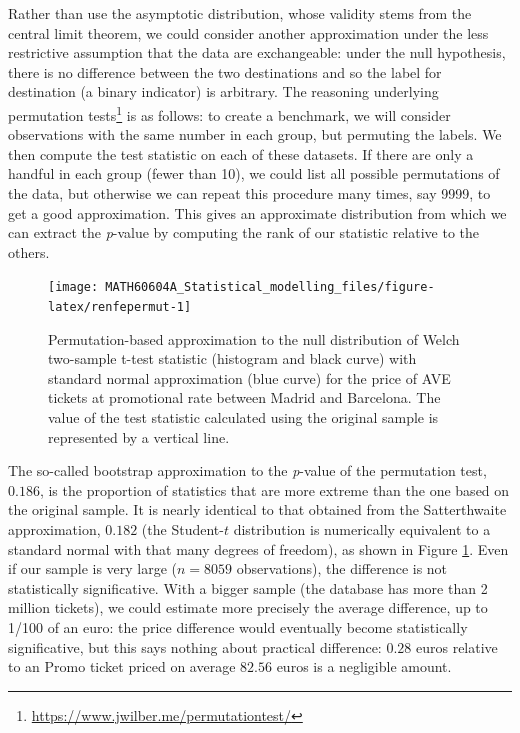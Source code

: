 \documentclass[
  11pt,
  letterpaper,
]{book}
\renewcommand{\href}[2]{#2\footnote{\url{#1}}}
\theoremstyle{definition}
\theoremstyle{definition}
\theoremstyle{definition}
\theoremstyle{definition}
\theoremstyle{remark}
\begin{document}
Rather than use the asymptotic distribution, whose validity stems from the central limit theorem, we could consider another approximation under the less restrictive assumption that the data are exchangeable: under the null hypothesis, there is no difference between the two destinations and so the label for destination (a binary indicator) is arbitrary. The reasoning underlying \href{https://www.jwilber.me/permutationtest/}{permutation tests} is as follows: to create a benchmark, we will consider observations with the same number in each group, but permuting the labels. We then compute the test statistic on each of these datasets. If there are only a handful in each group (fewer than 10), we could list all possible permutations of the data, but otherwise we can repeat this procedure many times, say 9999, to get a good approximation. This gives an approximate distribution from which we can extract the \emph{p}-value by computing the rank of our statistic relative to the others.

\begin{figure}

{\centering \texttt{[image: MATH60604A\_Statistical\_modelling\_files/figure-latex/renfepermut-1]} 

}

\caption{Permutation-based approximation to the null distribution of Welch two-sample t-test statistic (histogram and black curve) with standard normal approximation (blue curve) for the price of AVE tickets at promotional rate between Madrid and Barcelona. The value of the test statistic calculated using the original sample is represented by a vertical line.}\label{fig:renfepermut}
\end{figure}

The so-called bootstrap approximation to the \emph{p}-value of the permutation test, \(0.186\), is the proportion of statistics that are more extreme than the one based on the original sample. It is nearly identical to that obtained from the Satterthwaite approximation, \(0.182\) (the Student-\(t\) distribution is numerically equivalent to a standard normal with that many degrees of freedom), as shown in Figure \ref{fig:renfepermut}. Even if our sample is very large (\(n=8059\) observations), the difference is not statistically significative. With a bigger sample (the database has more than 2 million tickets), we could estimate more precisely the average difference, up to 1/100 of an euro: the price difference would eventually become statistically significative, but this says nothing about practical difference: \(0.28\) euros relative to an Promo ticket priced on average \(82.56\) euros is a negligible amount.
\end{document}
